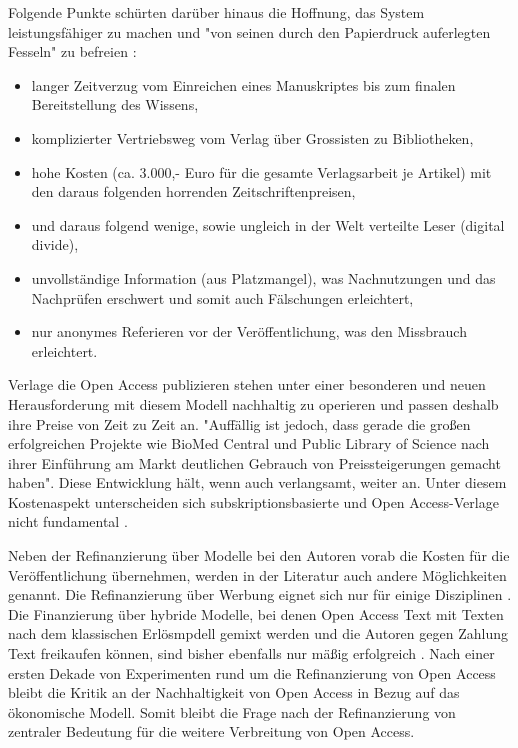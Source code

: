 Folgende Punkte schürten darüber hinaus die Hoffnung, das System leistungsfähiger zu machen und "von seinen durch den Papierdruck auferlegten Fesseln" zu befreien \cite{hilf_2004}:
\begin{itemize}
\item langer Zeitverzug vom Einreichen eines Manuskriptes bis zum finalen Bereitstellung des Wissens,
\item komplizierter Vertriebsweg vom Verlag über Grossisten zu Bibliotheken,
\item hohe Kosten (ca. 3.000,- Euro für die gesamte Verlagsarbeit je Artikel) mit den daraus folgenden horrenden Zeitschriftenpreisen,
\item und daraus folgend wenige, sowie ungleich in der Welt verteilte Leser (digital divide),
\item unvollständige Information (aus Platzmangel), was Nachnutzungen und das Nachprüfen erschwert und somit auch Fälschungen erleichtert,
\item nur anonymes Referieren vor der Veröffentlichung, was den Missbrauch erleichtert.
\end{itemize}

Verlage die Open Access publizieren stehen unter einer besonderen und neuen Herausforderung mit diesem Modell nachhaltig zu operieren und passen deshalb ihre Preise von Zeit zu Zeit an. "Auffällig ist jedoch, dass gerade die großen erfolgreichen Projekte wie BioMed Central und Public Library of Science nach ihrer Einführung am Markt deutlichen Gebrauch von Preissteigerungen gemacht haben"\cite{schmidt_2007_goldenen}. Diese Entwicklung hält, wenn auch verlangsamt, weiter an\cite{suchen}. Unter diesem Kostenaspekt unterscheiden sich subskriptionsbasierte und Open Access-Verlage nicht fundamental \cite{schmidt_2007_goldenen}.

Neben der Refinanzierung über Modelle bei den Autoren vorab die Kosten für die Veröffentlichung übernehmen, werden in der Literatur auch andere Möglichkeiten genannt. Die Refinanzierung über Werbung eignet sich nur für einige Disziplinen \cite{bjork_2004_open}. Die Finanzierung über hybride Modelle, bei denen Open Access Text mit Texten nach dem klassischen Erlösmpdell gemixt werden und die Autoren gegen Zahlung Text freikaufen können, sind bisher ebenfalls nur mäßig erfolgreich \cite{bjork_2012_hybrid}. Nach einer ersten Dekade von Experimenten rund um die Refinanzierung von Open Access bleibt die Kritik an der Nachhaltigkeit von Open Access in Bezug auf das ökonomische Modell. Somit bleibt die Frage nach der Refinanzierung von zentraler Bedeutung für die weitere Verbreitung von Open Access.

